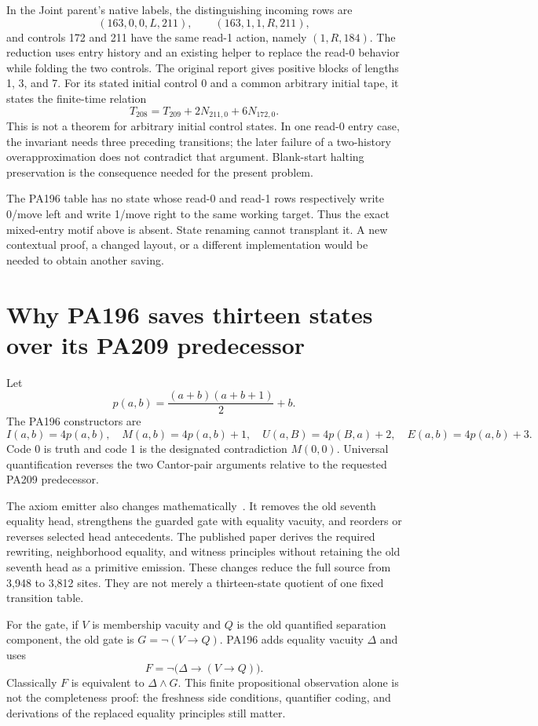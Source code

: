 \documentclass[11pt,letterpaper]{article}
\begin{document}
In the Joint parent's native labels, the distinguishing incoming rows are
\[
 (163,0,0,L,211),\qquad (163,1,1,R,211),
\]
and controls 172 and 211 have the same read-1 action, namely
\((1,R,184)\). The reduction uses entry history and an existing helper
to replace the read-0 behavior while folding the two controls. The
original report gives positive blocks of lengths 1, 3, and 7.
For its stated initial control 0 and a common arbitrary initial tape,
it states the finite-time relation
\[
 T_{208}=T_{209}+2N_{211,0}+6N_{172,0}.
\]
This is not a theorem for arbitrary initial control states. In one
read-0 entry case, the invariant needs three preceding transitions;
the later failure of a two-history overapproximation does not contradict
that argument. Blank-start halting preservation is the consequence
needed for the present problem.

The PA196 table has no state whose read-0 and read-1 rows respectively
write 0/move left and write 1/move right to the same working target.
Thus the exact mixed-entry motif above is absent. State renaming cannot
transplant it. A new contextual proof, a changed layout, or a different
implementation would be needed to obtain another saving.

\section{Why PA196 saves thirteen states over its PA209 predecessor}

Let
\[
 p(a,b)=\frac{(a+b)(a+b+1)}2+b.
\]
The PA196 constructors are
\[
 I(a,b)=4p(a,b),\quad M(a,b)=4p(a,b)+1,\quad
 U(a,B)=4p(B,a)+2,\quad E(a,b)=4p(a,b)+3.
\]
Code 0 is truth and code 1 is the designated contradiction
\(M(0,0)\). Universal quantification reverses the two Cantor-pair
arguments relative to the requested PA209 predecessor.

The axiom emitter also changes mathematically~\cite{pa196,pa209}. It removes the old
seventh equality head, strengthens the guarded gate with equality
vacuity, and reorders or reverses selected head antecedents. The
published paper derives the required rewriting, neighborhood equality,
and witness principles without retaining the old seventh head as a
primitive emission. These changes reduce the full source from 3,948 to
3,812 sites. They are not merely a thirteen-state quotient of one fixed
transition table.

For the gate, if \(V\) is membership vacuity and \(Q\) is the old
quantified separation component, the old gate is
\(G=\neg(V\to Q)\). PA196 adds equality vacuity \(\Delta\) and uses
\[
 F=\neg\bigl(\Delta\to(V\to Q)\bigr).
\]
Classically \(F\) is equivalent to \(\Delta\wedge G\). This finite
propositional observation alone is not the completeness proof: the
freshness side conditions, quantifier coding, and derivations of the
replaced equality principles still matter.
\end{document}
